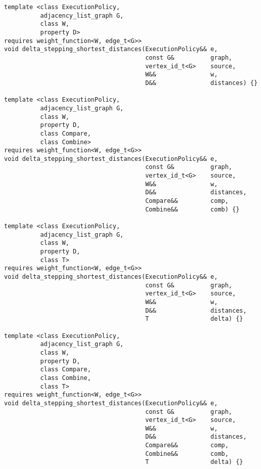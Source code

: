 \begin{lstlisting}
template <class ExecutionPolicy,
          adjacency_list_graph G,
          class W,
          property D>
requires weight_function<W, edge_t<G>>
void delta_stepping_shortest_distances(ExecutionPolicy&& e,
                                       const G&          graph,
                                       vertex_id_t<G>    source,
                                       W&&               w,
                                       D&&               distances) {}

template <class ExecutionPolicy,
          adjacency_list_graph G,
          class W,
          property D,
          class Compare,
          class Combine>
requires weight_function<W, edge_t<G>>
void delta_stepping_shortest_distances(ExecutionPolicy&& e,
                                       const G&          graph,
                                       vertex_id_t<G>    source,
                                       W&&               w,
                                       D&&               distances,
                                       Compare&&         comp,
                                       Combine&&         comb) {}

template <class ExecutionPolicy,
          adjacency_list_graph G,
          class W,
          property D,
          class T>
requires weight_function<W, edge_t<G>>
void delta_stepping_shortest_distances(ExecutionPolicy&& e,
                                       const G&          graph,
                                       vertex_id_t<G>    source,
                                       W&&               w,
                                       D&&               distances,
                                       T                 delta) {}

template <class ExecutionPolicy,
          adjacency_list_graph G,
          class W,
          property D,
          class Compare,
          class Combine,
          class T>
requires weight_function<W, edge_t<G>>
void delta_stepping_shortest_distances(ExecutionPolicy&& e,
                                       const G&          graph,
                                       vertex_id_t<G>    source,
                                       W&&               w,
                                       D&&               distances,
                                       Compare&&         comp,
                                       Combine&&         comb,
                                       T                 delta) {}

\end{lstlisting}




